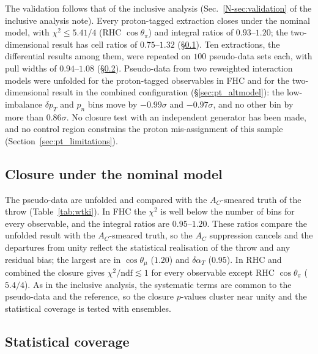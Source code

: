 \documentclass[11pt,a4paper]{article}
\newcommand{\noteref}[2]{#1~\ref{N-#2} of the inclusive analysis note}
\begin{document}
The validation follows that of the inclusive analysis (\noteref{Sec.}{sec:validation}). Every
proton-tagged extraction closes under the nominal model, with $\chi^2\le5.41/4$ (RHC $\cos\theta_\pi$)
and integral ratios of $0.93$--$1.20$; the two-dimensional result has cell ratios of $0.75$--$1.32$
(\S\ref{sec:pt_closure}). Ten extractions, the differential  results among them, were
repeated on $100$ pseudo-data sets each, with pull widths of $0.94$--$1.08$ (\S\ref{sec:pt_ensemble}). Pseudo-data from
two reweighted interaction models were unfolded for the proton-tagged observables in FHC and for the
two-dimensional result in the combined configuration (\S\ref{sec:pt_altmodel}): the low-imbalance
$\delta p_T$ and $p_n$ bins move by $-0.99\sigma$ and $-0.97\sigma$, and no other bin by more than
$0.86\sigma$. No closure test with an independent generator has been made, and no control region
constrains the proton mis-assignment of this sample (Section~\ref{sec:pt_limitations}).

\subsection{Closure under the nominal model}
\label{sec:pt_closure}

The pseudo-data are unfolded and compared with the $A_C$-smeared truth of the throw
(Table~\ref{tab:wtki}). In FHC the $\chi^2$ is well below the number of bins
for every observable, and the integral ratios are $0.95$--$1.20$. These ratios compare the unfolded
result with the $A_C$-smeared truth, so the $A_C$ suppression cancels and the departures from unity
reflect the statistical realisation of the throw and any residual bias; the largest are in
$\cos\theta_\mu$ ($1.20$) and $\delta\alpha_T$ ($0.95$). In RHC and combined the closure gives
$\chi^2/\mathrm{ndf}\lesssim1$ for every observable except RHC $\cos\theta_\pi$ ($5.4/4$). As in the inclusive
analysis, the systematic terms are common to the pseudo-data and the reference, so the closure
$p$-values cluster near unity and the statistical coverage is tested with ensembles.

\subsection{Statistical coverage}
\label{sec:pt_ensemble}
\end{document}
